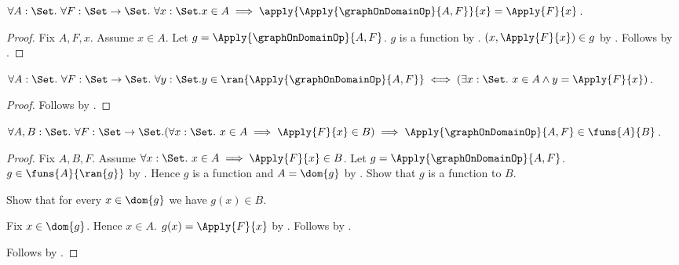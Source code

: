\begin{proposition}\label{logical_graph_on_domain_apply}
    $\forall A:\Set.\ \forall F:\Set\to\Set.\ \forall x:\Set.
        x\in A
        \implies
        \apply{\Apply{\graphOnDomainOp}{A,F}}{x}
            =\Apply{F}{x}$.
\end{proposition}
\begin{proof}
    Fix $A,F,x$.
    Assume $x\in A$.
    Let $g=\Apply{\graphOnDomainOp}{A,F}$.
    $g$ is a function by
        .
    $(x,\Apply{F}{x})\in g$ by
        .
    Follows by .
\end{proof}

\begin{proposition}\label{logical_graph_on_domain_range}
    $\forall A:\Set.\ \forall F:\Set\to\Set.\ \forall y:\Set.
        y\in\ran{\Apply{\graphOnDomainOp}{A,F}}
        \iff
        (\exists x:\Set.\ x\in A\land y=\Apply{F}{x})$.
\end{proposition}
\begin{proof}
    Follows by .
\end{proof}

\begin{theorem}\label{logical_graph_on_domain_type}
    $\forall A,B:\Set.\ \forall F:\Set\to\Set.
        (\forall x:\Set.\ x\in A\implies\Apply{F}{x}\in B)
        \implies
        \Apply{\graphOnDomainOp}{A,F}\in\funs{A}{B}$.
\end{theorem}
\begin{proof}
    Fix $A,B,F$.
    Assume $\forall x:\Set.\ x\in A\implies\Apply{F}{x}\in B$.
    Let $g=\Apply{\graphOnDomainOp}{A,F}$.
    $g\in\funs{A}{\ran{g}}$ by
        .
    Hence $g$ is a function and $A=\dom{g}$ by
        .
    Show that $g$ is a function to $B$.
    \begin{subproof}
        Show that for every $x\in\dom{g}$ we have $g(x)\in B$.
        \begin{subproof}
            Fix $x\in\dom{g}$.
            Hence $x\in A$.
            $g(x)=\Apply{F}{x}$ by
                .
            Follows by \auto.
        \end{subproof}
    \end{subproof}
    Follows by .
\end{proof}

